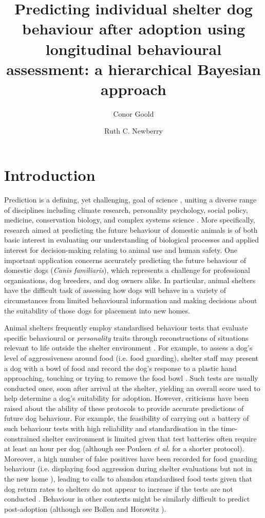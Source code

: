 \documentclass[fleqn,10pt]{wlscirep}
\title{Predicting individual shelter dog behaviour after adoption using longitudinal behavioural assessment: a hierarchical Bayesian approach}
\author[1]{Conor Goold}
\author[2*]{Ruth C. Newberry}
\affil[1]{School of Biology, Faculty of Biological Sciences, University of Leeds, Leeds, LS2 9JT, UK}
\affil[2]{Department of Animal and Aquacultural Sciences, Faculty of Biosciences, Norwegian University of Life Sciences, Aas, 1400, Norway}
\affil[*]{ruth.newberry@nmbu.no}
\begin{document}
\flushbottom
\maketitle
\thispagestyle{empty}

\section*{Introduction}
Prediction is a defining, yet challenging, goal of science \cite{hofstadter1951}, uniting a diverse range of disciplines including climate research, personality psychology, social policy, medicine, conservation biology, and complex systems science \cite{sarewitz1999}. More specifically, research aimed at predicting the future behaviour of domestic animals is of both basic interest in evaluating our understanding of biological processes and applied interest for decision-making relating to animal use and human safety. One important application concerns accurately predicting the future behaviour of domestic dogs (\textit{Canis familiaris}), which represents a challenge for professional organisations, dog breeders, and dog owners alike. In particular, animal shelters have the difficult task of assessing how dogs will behave in a variety of circumstances from limited behavioural information and making decisions about the suitability of those dogs for placement into new homes.

Animal shelters frequently employ standardised behaviour tests that evaluate specific behavioural or \textit{personality} traits through reconstructions of situations relevant to life outside the shelter environment \cite{vanderborg1991,marston2003,mornement2010,taylor2006,rayment2015,clay2020behaviour}. For example, to assess a dog's level of aggressiveness around food (i.e. food guarding), shelter staff may present a dog with a bowl of food and record the dog's response to a plastic hand approaching, touching or trying to remove the food bowl \cite{mohangibbons2012,mohangibbons2018,marder2013}. Such tests are usually conducted once, soon after arrival at the shelter, yielding an overall score used to help determine a dog's suitability for adoption. However, criticisms have been raised about the ability of these protocols to provide accurate predictions of future dog behaviour. For example, the feasibility of carrying out a battery of such behaviour tests with high reliability and standardisation in the time-constrained shelter environment is limited given that test batteries often require at least an hour per dog \cite{vanderborg1991,mornement2009} (although see Poulsen \textit{et al.} \cite{poulsen2010} for a shorter protocol). Moreover, a high number of false positives have been recorded for food guarding behaviour (i.e. displaying food aggression during shelter evaluations but not in the new home \cite{mohangibbons2012,marder2013}), leading to calls to abandon standardised food tests given that dog return rates to shelters do not appear to increase if the tests are not conducted \cite{mohangibbons2018}. Behaviour in other contexts might be similarly difficult to predict post-adoption \cite{christensen2007,mornement2015} (although see Bollen and Horowitz \cite{bollen2008}).
\end{document}
